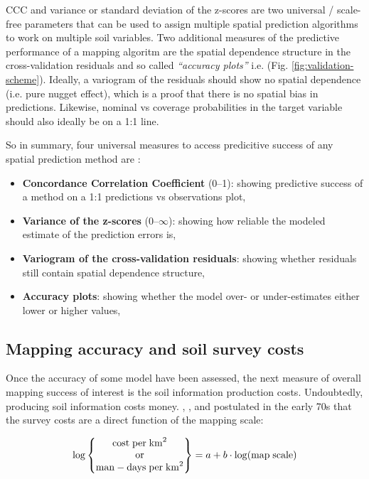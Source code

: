 \documentclass[graybox,natbib,nospthms,UStrade]{svmono}
\providecommand{\tightlist}{%
  \setlength{\itemsep}{0pt}\setlength{\parskip}{0pt}}
\providecommand{\tightlist}{\setlength{\itemsep}{0pt}\setlength{\parskip}{0pt}}
\begin{document}
CCC and variance or standard deviation of the z-scores are two universal /
scale-free parameters that can be used to assign multiple spatial prediction
algorithms to work on multiple soil variables. Two additional measures of the
predictive performance of a mapping algoritm are the spatial dependence structure
in the cross-validation residuals and so called \emph{``accuracy plots''}
i.e. \citep{goovaerts1999geostatistics} (Fig. \ref{fig:validation-scheme}).
Ideally, a variogram of the residuals should show no spatial dependence (i.e.
pure nugget effect), which is a proof that there is no spatial bias in predictions.
Likewise, nominal vs coverage probabilities in the target variable should also ideally
be on a 1:1 line.

So in summary, four universal measures to access predicitive success of
any spatial prediction method are \citep{Hengl2018RFsp}:

\begin{itemize}
\tightlist
\item
  \textbf{Concordance Correlation Coefficient} (0--1): showing predictive success
  of a method on a 1:1 predictions vs observations plot,
\item
  \textbf{Variance of the z-scores} (0--\(\infty\)): showing how reliable the
  modeled estimate of the prediction errors is,
\item
  \textbf{Variogram of the cross-validation residuals}: showing whether
  residuals still contain spatial dependence structure,
\item
  \textbf{Accuracy plots}: showing whether the model over- or under-estimates
  either lower or higher values,
\end{itemize}

\hypertarget{mapping-accuracy-and-soil-survey-costs}{%
\subsection{Mapping accuracy and soil survey costs}\label{mapping-accuracy-and-soil-survey-costs}}

Once the accuracy of some model have been assessed, the next measure of
overall mapping success of interest is the soil information production
costs. Undoubtedly, producing soil information costs money.
\citet{Burrough1971}, \citet{BieUlph1972JAE}, and \citet{Bie1973JSS} postulated in the early
70s that the survey costs are a direct function of the mapping
scale:

\begin{equation}
\log \begin{Bmatrix}
{\rm cost} \; {\rm per} \; {\rm km}^2\\
{\rm or}\\
{\rm man-days} \; {\rm per} \; {\rm km}^2
\end{Bmatrix}
= a + b \cdot \log( {\rm map} \; {\rm scale} )
\label{eq:burrough}
\end{equation}
\end{document}
